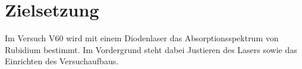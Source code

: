 \section{Zielsetzung}
\label{sec:Zielsetzung}

Im Versuch V60 wird mit einem Diodenlaser das Absorptionsspektrum von Rubidium bestimmt.
Im Vordergrund steht dabei Justieren des Lasers sowie das Einrichten des Versuchaufbaus.